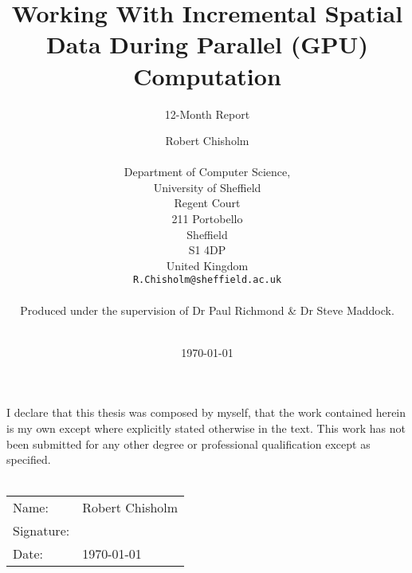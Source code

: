 \author{Robert Chisholm\\
	\\
	Department of Computer Science,\\
	University of Sheffield\\
	Regent Court\\
	211 Portobello\\
	Sheffield\\
	S1 4DP\\
	United Kingdom\\
	\texttt{R.Chisholm@sheffield.ac.uk}\\
	\\
	Produced under the supervision of Dr Paul Richmond \& Dr Steve Maddock.\\
	\\
}
\title{Working With Incremental Spatial Data During Parallel (GPU) Computation}
\subtitle{12-Month Report}
\date{\today}
\maketitle
\newpage
\renewcommand{\titlepage}{\relax}

\setcounter{page}{1}
\vspace*{\fill}
\thispagestyle{plain}

\begin{minipage}[t]{1\columnwidth}%
I declare that this thesis was composed by myself, that the work contained
herein is my own except where explicitly stated otherwise in the text.
This work has not been submitted for any other degree or professional
qualification except as specified.\\ \\%
\end{minipage}

\begin{table}[h] 
\centering 
\begin{tabular}{l l} 
Name: & Robert Chisholm \\
Signature: & \\
Date: & \today \\
\end{tabular} 
\end{table}
\vspace*{\fill}
\clearpage

